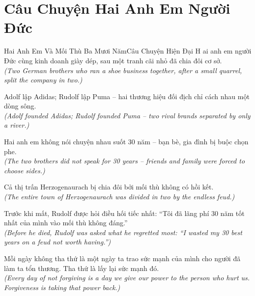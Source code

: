 \section{Câu Chuyện Hai Anh Em Người Đức}
\begin{truyen}{Hai Anh Em Và Mối Thù Ba Mươi Năm}{Câu Chuyện Hiện Đại}
H ai anh em người Đức cùng kinh doanh giày dép, sau một tranh cãi nhỏ đã chia đôi cơ sở.\\
\textit{(Two German brothers who ran a shoe business together, after a small quarrel, split the company in two.)}

Adolf lập Adidas; Rudolf lập Puma -- hai thương hiệu đối địch chỉ cách nhau một dòng sông.\\
\textit{(Adolf founded Adidas; Rudolf founded Puma -- two rival brands separated by only a river.)}

Hai anh em không nói chuyện nhau suốt 30 năm -- bạn bè, gia đình bị buộc chọn phe.\\
\textit{(The two brothers did not speak for 30 years -- friends and family were forced to choose sides.)}

Cả thị trấn Herzogenaurach bị chia đôi bởi mối thù không có hồi kết.\\
\textit{(The entire town of Herzogenaurach was divided in two by the endless feud.)}

Trước khi mất, Rudolf được hỏi điều hối tiếc nhất: ``Tôi đã lãng phí 30 năm tốt nhất của mình vào mối thù không đáng.''\\
\textit{(Before he died, Rudolf was asked what he regretted most: ``I wasted my 30 best years on a feud not worth having.'')}

\end{truyen}
\begin{baihoc}
  Mỗi ngày không tha thứ là một ngày ta trao sức mạnh của mình cho người đã làm ta tổn thương. Tha thứ là lấy lại sức mạnh đó.\\
  \textit{(Every day of not forgiving is a day we give our power to the person who hurt us. Forgiveness is taking that power back.)}
\end{baihoc}

